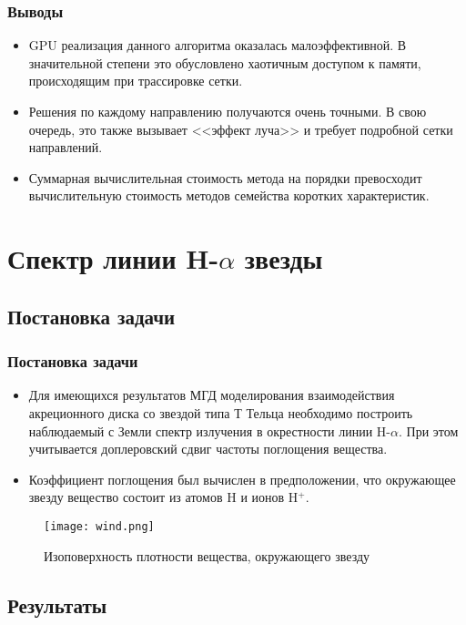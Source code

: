 \documentclass[unicode,aspectratio=43]{beamer}
\begin{document}
\begin{frame}\frametitle{Выводы}
	\begin{itemize}
	\item GPU реализация данного алгоритма оказалась малоэффективной. В
значительной степени это обусловлено хаотичным доступом к памяти, происходящим
при трассировке сетки.
	\item Решения по каждому направлению получаются очень точными. В свою
очередь, это также вызывает <<эффект луча>> и требует подробной сетки
направлений.
	\item Суммарная вычислительная стоимость метода на порядки превосходит 
	вычислительную стоимость методов семейства коротких характеристик.
	\end{itemize}
\end{frame}

\section{Спектр линии H-$\alpha$ звезды}

\subsection{Постановка задачи}
\begin{frame}\frametitle{Постановка задачи}
\begin{itemize}
\item
Для имеющихся результатов МГД моделирования взаимодействия акреционного диска со звездой типа Т Тельца необходимо построить наблюдаемый с Земли спектр излучения в окрестности линии H-$\alpha$. При этом учитывается доплеровский сдвиг частоты поглощения вещества.
\item Коэффициент поглощения был вычислен в предположении, что окружающее звезду
вещество состоит из атомов H и ионов H$^{+}$.
\end{itemize}
\begin{figure}[ht!]
\centering
\texttt{[image: wind.png]}
\caption{Изоповерхность плотности вещества, окружающего звезду}
\end{figure}
\end{frame}

\subsection{Результаты}
\end{document}
